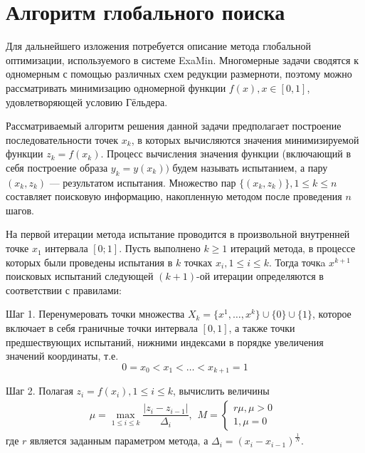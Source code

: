 \section{Алгоритм глобального поиска}
 Для дальнейшего изложения потребуется описание метода глобальной оптимизации, используемого в системе ExaMin. Многомерные задачи сводятся к одномерным с помощью различных схем редукции размерноти,
 поэтому можно рассматривать минимизацию одномерной функции  \(f(x), x\in[0,1]\), удовлетворяющей условию Гёльдера.
\par
Рассматриваемый алгоритм решения данной задачи предполагает построение последовательности точек \(x_k\), в которых вычисляются значения минимизируемой функции \(z_k = f(x_k)\).
Процесс вычисления значения функции (включающий в себя построение образа \(y_k=y(x_k))\) будем называть испытанием, а пару \((x_k,z_k)\) --- результатом испытания.
Множество пар \(\{(x_k,z_k)\}, 1\leqslant k\leqslant n\) составляет поисковую информацию, накопленную методом после проведения \(n\) шагов.
\par
На первой итерации метода испытание проводится в произвольной внутренней точке \(x_1\) интервала \([0;1]\). Пусть выполнено \(k\geqslant 1\) итераций метода,
в процессе которых были проведены испытания в \(k\) точках \(x_i, 1\leqslant i\leqslant k\). Тогда точкa \(x^{k+1}\) поисковых испытаний следующей \((k+1)\)-ой
итерации определяются в соответствии с правилами:
\par
Шаг 1. Перенумеровать точки множества \(X_k=\{x^1,\dotsc,x^k\}\cup\{0\}\cup\{1\}\), которое включает в себя граничные точки интервала \([0,1]\), а также точки предшествующих испытаний, нижними индексами в порядке увеличения значений координаты, т.е.
\begin{displaymath}
0=x_0<x_1<\dotsc<x_{k+1}=1
\end{displaymath}
\par
Шаг 2. Полагая \(z_i=f(x_i),1\leqslant i\leqslant k\), вычислить величины
\begin{equation}
\label{step2}
\mu=\max_{1\leqslant i\leqslant k}\dfrac{|z_i-z_{i-1}|}{\Delta_i},
\begin{matrix}
    M =
    \left\{
    \begin{matrix}
    r\mu,\mu>0 \\
    1,\mu=0
    \end{matrix} \right.
    \end{matrix}
\end{equation}
где \(r\) является заданным параметром метода, а \(\Delta_i=(x_i-x_{i-1})^\frac{1}{N}\).
